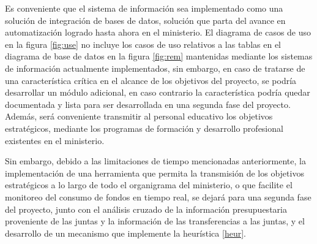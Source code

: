 \documentclass{article}
\begin{document}
\begin{multicols}{6}[]
Es conveniente que el sistema de informaci\'on sea implementado como una soluci\'on de integraci\'on de bases de datos, soluci\'on que parta del avance en automatizaci\'on logrado hasta ahora en el ministerio. El diagrama de casos de uso en la figura \ref{fig:use} no incluye los casos de uso relativos a las tablas en el diagrama de base de datos en la figura \ref{fig:rem} mantenidas mediante los sistemas de informaci\'on actualmente implementados, sin embargo, en caso de tratarse de una caracter\'istica cr\'itica en el alcance de los objetivos del proyecto, se podr\'ia desarrollar un m\'odulo adicional, en caso contrario la caracter\'istica podr\'ia quedar documentada y lista para ser desarrollada en una segunda fase del proyecto. Adem\'as, ser\'a conveniente transmitir al personal educativo los objetivos estrat\'egicos, mediante los programas de formaci\'on y desarrollo profesional existentes en el ministerio.

Sin embargo, debido a las limitaciones de tiempo mencionadas anteriormente, la implementaci\'on de una herramienta que permita la transmisi\'on de los objetivos estrat\'egicos a lo largo de todo el organigrama del ministerio, o que facilite el monitoreo del consumo de fondos en tiempo real, se dejar\'a para una segunda fase del proyecto, junto con el an\'alisis cruzado de la informaci\'on presupuestaria proveniente de las juntas y la informaci\'on de las transferencias a las juntas, y el desarrollo de un mecanismo que implemente la heur\'istica \ref{heur}.




\end{multicols}

\hfill \break
\hfill \break
\hfill \break
\hfill \break
\end{document}
